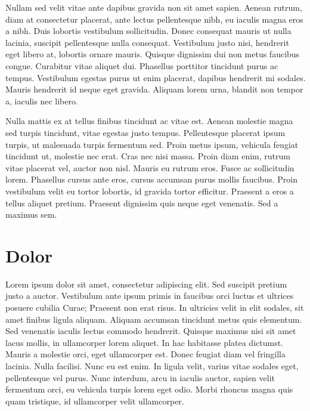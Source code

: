 Nullam sed velit vitae ante dapibus gravida non sit amet sapien. Aenean rutrum, diam at consectetur placerat, ante lectus pellentesque nibh, eu iaculis magna eros a nibh. Duis lobortis vestibulum sollicitudin. Donec consequat mauris ut nulla lacinia, suscipit pellentesque nulla consequat. Vestibulum justo nisi, hendrerit eget libero at, lobortis ornare mauris. Quisque dignissim dui non metus faucibus congue. Curabitur vitae aliquet dui. Phasellus porttitor tincidunt purus ac tempus. Vestibulum egestas purus ut enim placerat, dapibus hendrerit mi sodales. Mauris hendrerit id neque eget gravida. Aliquam lorem urna, blandit non tempor a, iaculis nec libero.

Nulla mattis ex at tellus finibus tincidunt ac vitae est. Aenean molestie magna sed turpis tincidunt, vitae egestas justo tempus. Pellentesque placerat ipsum turpis, ut malesuada turpis fermentum sed. Proin metus ipsum, vehicula feugiat tincidunt ut, molestie nec erat. Cras nec nisi massa. Proin diam enim, rutrum vitae placerat vel, auctor non nisl. Mauris eu rutrum eros. Fusce ac sollicitudin lorem. Phasellus cursus ante eros, cursus accumsan purus mollis faucibus. Proin vestibulum velit eu tortor lobortis, id gravida tortor efficitur. Praesent a eros a tellus aliquet pretium. Praesent dignissim quis neque eget venenatis. Sed a maximus sem.

\section{Dolor}

Lorem ipsum dolor sit amet, consectetur adipiscing elit. Sed suscipit pretium justo a auctor. Vestibulum ante ipsum primis in faucibus orci luctus et ultrices posuere cubilia Curae; Praesent non erat risus. In ultricies velit in elit sodales, sit amet finibus ligula aliquam. Aliquam accumsan tincidunt metus quis elementum. Sed venenatis iaculis lectus commodo hendrerit. Quisque maximus nisi sit amet lacus mollis, in ullamcorper lorem aliquet. In hac habitasse platea dictumst. Mauris a molestie orci, eget ullamcorper est. Donec feugiat diam vel fringilla lacinia. Nulla facilisi. Nunc eu est enim. In ligula velit, varius vitae sodales eget, pellentesque vel purus. Nunc interdum, arcu in iaculis auctor, sapien velit fermentum orci, eu vehicula turpis lorem eget odio. Morbi rhoncus magna quis quam tristique, id ullamcorper velit ullamcorper.


